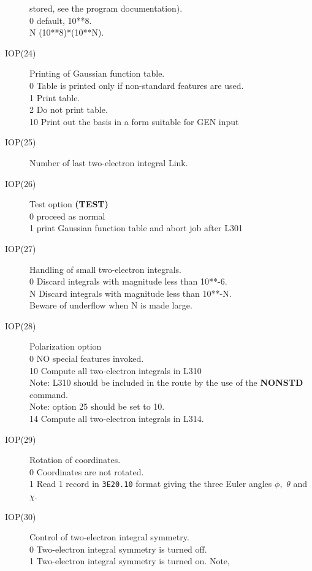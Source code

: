 \begin{description}
stored, see the program documentation).  \\
0  default, 10**8. \\
N (10**8)*(10**N).
\item[IOP(24)]  Printing of Gaussian function table.  \\
0  Table is printed only if non-standard features are used. \\
1  Print table. \\
2  Do not print table. \\
10 Print out the basis in a form suitable for GEN input \\
\item[IOP(25)]  Number of last two-electron integral Link.
\item[IOP(26)]  Test option {\bf (TEST)}  \\
0  proceed as normal \\
1  print Gaussian function table and abort job after L301 \\
\item[IOP(27)]  Handling of small two-electron integrals.  \\
0  Discard integrals with magnitude less than 10**-6. \\
N Discard integrals with magnitude less than 10**-N.  \\
Beware of underflow when N is made large.
\item[IOP(28)]  Polarization option  \\
0  NO special features invoked. \\
10 Compute all two-electron integrals in L310 \\
Note: L310 should be included in the route by the use of
the {\bf NONSTD} command.  \\
Note: option 25 should be set to 10.  \\
14 Compute all two-electron integrals in L314. \\
\item[IOP(29)]  Rotation of coordinates.  \\
0  Coordinates are not rotated. \\
1  Read 1 record in {\tt 3E20.10} format giving the three Euler 
angles $\phi,$ $\theta$ and $\chi$.  \\
\item[IOP(30)]  Control of two-electron integral symmetry.  \\
0  Two-electron integral symmetry is turned off. \\
1  Two-electron integral symmetry is turned on. Note, 

\end{description}
